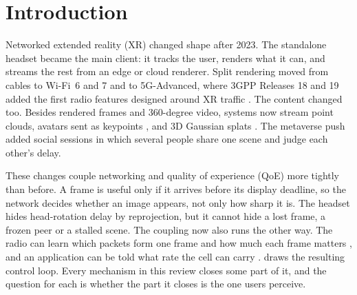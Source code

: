 \section{Introduction}\label{sec:intro}

Networked extended reality (XR) changed shape after 2023. The standalone headset became the main client:
it tracks the user, renders what it can, and streams the rest from an edge or cloud renderer. Split
rendering moved from cables to Wi-Fi~6 and 7 and to 5G-Advanced, where 3GPP Releases 18 and 19 added the
first radio features designed around XR traffic \cite{W7164211432}. The content changed too.
Besides rendered frames and 360-degree video, systems now stream point clouds, avatars sent as keypoints
\cite{W4403981191}, and 3D Gaussian splats \cite{W4416477288}. The metaverse push added social sessions in
which several people share one scene and judge each other's delay.

These changes couple networking and quality of experience (QoE) more tightly than before. A frame is
useful only if it arrives before its display deadline, so the network decides whether an image appears,
not only how sharp it is. The headset hides head-rotation delay by reprojection, but it cannot hide a lost
frame, a frozen peer or a stalled scene. The coupling now also runs the other way. The radio can learn
which packets form one frame and how much each frame matters \cite{W4410582180}, and an application can be
told what rate the cell can carry \cite{W7161282618}.  draws the resulting control loop.
Every mechanism in this review closes some part of it, and the question for each is whether the part it
closes is the one users perceive.

